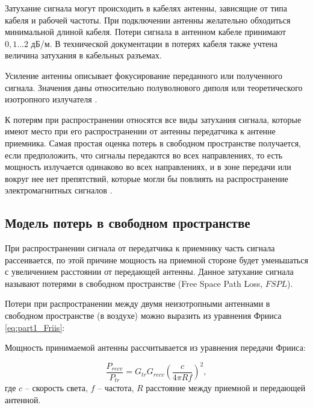 Затухание сигнала могут происходить в кабелях антенны, зависящие от типа кабеля и рабочей частоты. При подключении антенны желательно обходиться минимальной длиной кабеля. Потери сигнала в антенном кабеле принимают $0, 1...2$ дБ/м. В технической документации в потерях кабеля также учтена величина затухания в кабельных разъемах. 

Усиление антенны описывает фокусирование переданного или полученного сигнала. Значения даны относительно полуволнового диполя или теоретического изотропного излучателя \cite{Gost62657}.


К потерям при распространении относятся все виды затухания сигнала, которые имеют место при его распространении от антенны передатчика к антенне приемника. Самая простая оценка потерь в свободном пространстве получается, если предположить, что сигналы передаются во всех направлениях, то есть мощность излучается одинаково во всех направлениях, и в зоне передачи или вокруг нее нет препятствий, которые могли бы повлиять на распространение электромагнитных сигналов \cite{Krouk2010}. 


\subsection{Модель потерь в свободном пространстве}
При распространении сигнала от передатчика к приемнику часть сигнала рассеивается, по этой причине мощность на приемной стороне будет уменьшаться с увеличением  расстоянии от передающей антенны. Данное затухание сигнала называют потерями в свободном пространстве (Free Space Path Loss, $FSPL$).

Потери при распространении между двумя неизотропными антеннами в свободном пространстве (в воздухе) можно выразить из уравнения Фрииса \cref{eq:part1_Friis}:



Мощность принимаемой антенны рассчитывается из уравнения передачи Фрииса:

\begin{equation}
  \label{eq:part1_Friis}
  \frac{P_{recv}}{P_{tr}} = G_{tr}G_{recv}\left(\frac{c}{4\pi R f} \right)^2,
\end{equation}
где
$c$ --  скорость света,
$f$ -- частота, 
$R$ расстояние между приемной и передающей антенной.

